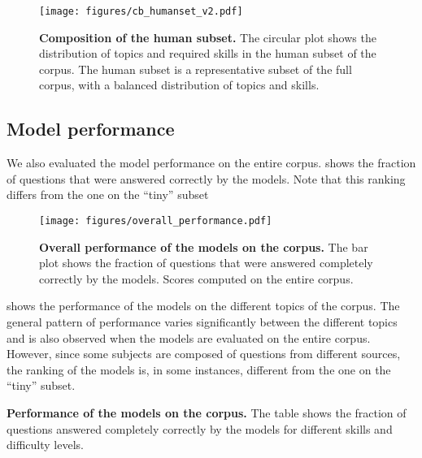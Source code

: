 

\begin{figure}
    \centering
    \texttt{[image: figures/cb\_humanset\_v2.pdf]}
    \caption{\textbf{Composition of the human subset.} The circular plot shows the distribution of topics and required skills in the human subset of the \chembench corpus. The human subset is a representative subset of the full corpus, with a balanced distribution of topics and skills.}
\end{figure}

\subsection{Model performance}
We also evaluated the model performance on the entire \chembench corpus. 
 shows the fraction of questions that were answered correctly by the models. 
Note that this ranking differs from the one on the \enquote{tiny} subset

\begin{figure}[htb]
    \centering
    \texttt{[image: figures/overall\_performance.pdf]}
    \caption{\textbf{Overall performance of the models on the \chembench corpus.} The bar plot shows the fraction of questions that were answered completely correctly by the models. Scores computed on the entire \chembench corpus.}
    \label{fig:barplot_all_correct_all_questions}
\end{figure}

 shows the performance of the models on the different topics of the \chembench corpus.
The general pattern of performance varies significantly between the different topics and is also observed when the models are evaluated on the entire corpus. 
However, since some subjects are composed of questions from different sources, the ranking of the models is, in some instances, different from the one on the \enquote{tiny} subset.

\begin{table}
    \caption{\textbf{Performance of the models on the \chembench corpus.} The table shows the fraction of questions answered completely correctly by the models for different skills and difficulty levels.}
\end{table}

